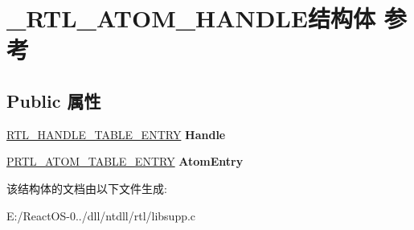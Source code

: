 \hypertarget{struct___r_t_l___a_t_o_m___h_a_n_d_l_e}{}\section{\+\_\+\+R\+T\+L\+\_\+\+A\+T\+O\+M\+\_\+\+H\+A\+N\+D\+L\+E结构体 参考}
\label{struct___r_t_l___a_t_o_m___h_a_n_d_l_e}
\subsection*{Public 属性}
\begin{DoxyCompactItemize}
\item 
\mbox{\label{struct___r_t_l___a_t_o_m___h_a_n_d_l_e_a2e7522a413b2da312c2c7e3b99ed993b}} 
\hyperlink{struct___r_t_l___h_a_n_d_l_e___t_a_b_l_e___e_n_t_r_y}{R\+T\+L\+\_\+\+H\+A\+N\+D\+L\+E\+\_\+\+T\+A\+B\+L\+E\+\_\+\+E\+N\+T\+RY} {\bfseries Handle}
\item 
\mbox{\label{struct___r_t_l___a_t_o_m___h_a_n_d_l_e_a74fba12cf0b9777908953908949b3da2}} 
\hyperlink{struct___r_t_l___a_t_o_m___t_a_b_l_e___e_n_t_r_y}{P\+R\+T\+L\+\_\+\+A\+T\+O\+M\+\_\+\+T\+A\+B\+L\+E\+\_\+\+E\+N\+T\+RY} {\bfseries Atom\+Entry}
\end{DoxyCompactItemize}


该结构体的文档由以下文件生成\+:\begin{DoxyCompactItemize}
\item 
E\+:/\+React\+O\+S-\/0../dll/ntdll/rtl/libsupp.\+c\end{DoxyCompactItemize}
